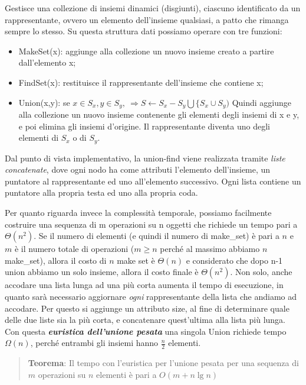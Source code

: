 \documentclass[
]{article}
\begin{document}
Gestisce una collezione di insiemi dinamici (disgiunti), ciascuno
identificato da un rappresentante, ovvero un elemento dell'insieme
qualsiasi, a patto che rimanga sempre lo stesso. Su questa struttura
dati possiamo operare con tre funzioni:

\begin{itemize}
\item
  MakeSet(x): aggiunge alla collezione un nuovo insieme creato a partire
  dall'elemento x;
\item
  FindSet(x): restituisce il rappresentante dell'insieme che contiene x;
\item
  Union(x,y): se
  \(x \in S_x, y \in S_y, \ \Rightarrow S \leftarrow S_x -S_y \bigcup \{S_x \cup S_y)\)
  Quindi aggiunge alla collezione un nuovo insieme contenente gli
  elementi degli insiemi di x e y, e poi elimina gli insiemi d'origine.
  Il rappresentante diventa uno degli elementi di \(S_x\) o di \(S_y\).
\end{itemize}

Dal punto di vista implementativo, la union-find viene realizzata
tramite \emph{liste concatenate}, dove ogni nodo ha come attributi
l'elemento dell'insieme, un puntatore al rappresentante ed uno
all'elemento successivo. Ogni lista contiene un puntatore alla propria
testa ed uno alla propria coda.

Per quanto riguarda invece la complessità temporale, possiamo facilmente
costruire una sequenza di m operazioni su n oggetti che richiede un
tempo pari a \(\Theta(n^2)\). Se il numero di elementi (e quindi il
numero di make\_set) è pari a \(n\) e \(m\) è il numero totale di
operazioni (\(m \geq n\) perché al massimo abbiamo \(n\) make\_set),
allora il costo di \(n\) make set è \(\Theta(n)\) e considerato che dopo
n-1 union abbiamo un solo insieme, allora il costo finale è
\(\Theta(n^2)\). Non solo, anche accodare una lista lunga ad una più
corta aumenta il tempo di esecuzione, in quanto sarà necessario
aggiornare \emph{ogni} rappresentante della lista che andiamo ad
accodare. Per questo si aggiunge un attributo size, al fine di
determinare quale delle due liste sia la più corta, e concatenare
quest'ultima alla lista più lunga. Con questa \textbf{\emph{euristica
dell'unione pesata}} una singola Union richiede tempo \(\Omega(n)\),
perché entrambi gli insiemi hanno \(\frac{n}{2}\) elementi.

\begin{quote}
\textbf{Teorema}: Il tempo con l'euristica per l'unione pesata per una
sequenza di \(m\) operazioni su \(n\) elementi è pari a \(O(m+n\lg n)\)
\end{quote}
\end{document}
